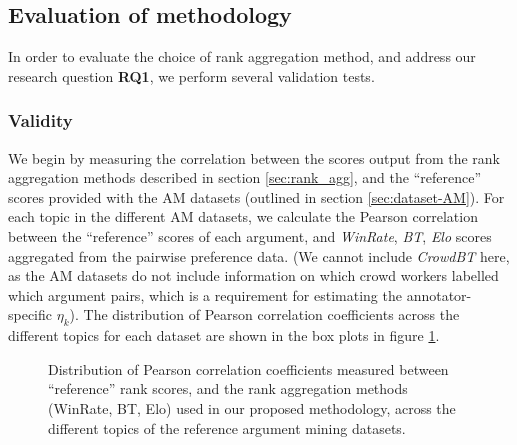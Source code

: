 \documentclass[notitlepage,12pt]{jedm}
\begin{document}
 
\subsection{Evaluation of methodology}\label{sec:methodology_eval}

In order to evaluate the choice of rank aggregation method, and address our 
research question \textbf{RQ1}, we perform several validation tests.

\subsubsection{Validity}
We begin by measuring the correlation between the scores output from the rank 
aggregation methods described in section \ref{sec:rank_agg}, and the 
``reference'' scores provided with the AM datasets (outlined in section 
\ref{sec:dataset-AM}).
For each topic in the different AM datasets, we calculate the Pearson 
correlation between the ``reference'' scores of each argument, and 
\textit{WinRate}, \textit{BT}, \textit{Elo} scores aggregated from the pairwise 
preference data. (We cannot include \textit{CrowdBT} here, as the AM datasets 
do not include information on which crowd workers labelled which argument 
pairs, which is a requirement for estimating the annotator-specific $\eta_k$).
The distribution of Pearson correlation coefficients across the different 
topics for each dataset are shown in the box plots in figure 
\ref{fig:corr_to_reference_score}.

\begin{figure}[H]
	\centering
	\scalebox{0.5}{}
	\caption{Distribution of Pearson correlation coefficients measured between 
		``reference'' rank scores, and the rank aggregation methods (WinRate, 
		BT, Elo) used in our proposed methodology, across the different topics 
		of the reference argument mining datasets.}
	\label{fig:corr_to_reference_score}
\end{figure}
\end{document}
